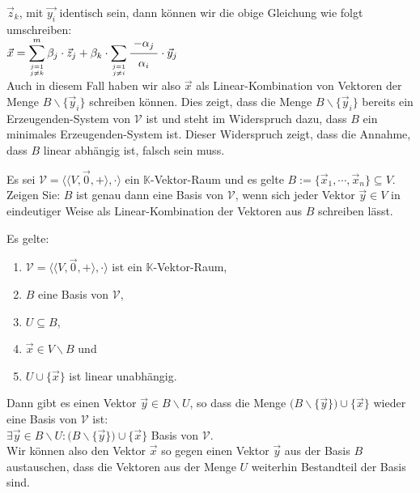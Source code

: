 $\vec{z}_k$, mit $\vec{y_i}$ identisch sein, dann k\"{o}nnen wir die obige Gleichung wie folgt
umschreiben:
\\[0.2cm]
\hspace*{1.3cm}
$\ds\vec{x} = \sum\limits_{j=1 \atop j \not=k}^m \beta_j \cdot \vec{z}_j + 
              \beta_k \cdot \sum\limits_{j=1 \atop j \not= i} \bruch{-\alpha_j}{\alpha_i} \cdot \vec{y}_j
$
\\[0.2cm]
Auch in diesem Fall haben wir also $\vec{x}$ als Linear-Kombination von Vektoren der Menge 
$B \backslash \{ \vec{y}_i \}$ schreiben k\"{o}nnen.  Dies zeigt, dass die Menge
$B \backslash \{ \vec{y}_i \}$ bereits ein Erzeugenden-System von $\mathcal{V}$ ist und steht im
Widerspruch dazu, dass $B$ ein minimales Erzeugenden-System ist.  Dieser Widerspruch zeigt, dass die
Annahme, dass $B$ linear abh\"{a}ngig ist, falsch sein muss. \qeds

\exercise
Es sei $\mathcal{V} = \bigl\langle \langle V, \vec{0}, + \rangle, \cdot \bigr\rangle$ ein $\mathbb{K}$-Vektor-Raum und es gelte $B := \{ \vec{x}_1, \cdots, \vec{x}_n \} \subseteq V$.
Zeigen Sie:  $B$ ist genau dann eine Basis von $\mathcal{V}$, wenn sich jeder Vektor $\vec{y} \in V$ in
eindeutiger Weise als Linear-Kombination der Vektoren aus $B$ schreiben l\"{a}sst.
\eox

\begin{Lemma}
  Es gelte:
  \begin{enumerate}
  \item $\mathcal{V} = \bigl\langle \langle V, \vec{0}, + \rangle, \cdot \bigr\rangle$ ist ein $\mathbb{K}$-Vektor-Raum, 
  \item $B$ eine Basis von $\mathcal{V}$,
  \item $U \subseteq B$,
  \item $\vec{x} \in V\backslash B$ und 
  \item $U \cup \{ \vec{x} \}$ ist linear unabh\"{a}ngig.
  \end{enumerate}
  Dann gibt es einen Vektor $\vec{y} \in B \backslash U$, so dass die Menge
  $\bigl(B \backslash \{ \vec{y} \}\bigr) \cup \{ \vec{x} \}$ wieder eine Basis von $\mathcal{V}$ ist:
  \\[0.2cm]
  \hspace*{1.3cm}
  $\exists \vec{y} \in B \backslash U: \bigl(B \backslash \{ \vec{y} \}\bigr) \cup \{ \vec{x} \}$ Basis von $\mathcal{V}$.
  \\[0.2cm]
  Wir k\"{o}nnen also den Vektor $\vec{x}$ so gegen einen Vektor $\vec{y}$ aus der Basis $B$
  austauschen, dass die Vektoren aus der Menge $U$ weiterhin Bestandteil der Basis sind.
\end{Lemma}

